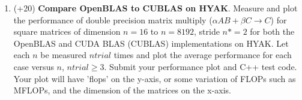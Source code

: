 \documentclass[10pt]{article}
\theoremstyle{definition}
\theoremstyle{remark}
\newtheorem*{solution}{Solution}
\begin{document}
\begin{enumerate}
\begin{enumerate}[label=\alph*]
        \item Find the temperature in the rod given initial conditions $\kappa = 10^3 \frac{m^2}{s}$ and 
        \begin{align*}
        T(x,0) = \begin{cases}
        0 & |x| > 1 m \\
        100^{o} C & |x| \le 1 m 
        \end{cases}
        \end{align*}
        \begin{solution}
            We are given $T_0(x) = T(x,0)$ as defined above. We begin by Fourier transforming this initial condition to find $\hat T_0(k)$.
            \begin{align*}
                \hat T_0(k) &= \frac{1}{\sqrt{2\pi}} \int_{-\infty}^\infty T_0(x) e^{ikx} dx \\
                &= \frac{100}{\sqrt{2\pi}} \int_{-1}^1 e^{ikx} dx = \frac{100}{\sqrt{2\pi}} \frac{e^{ikx}}{ik} \Bigg|_{-1}^1 \\&= 100\sqrt{\frac{2}{\pi}} \frac{\sin(k)}{k}
            \end{align*}

            Having found $\hat T_0(k)$, we can plug this in to our inverse Fourier transform expression derived in part (a) to recover our solution $T(x,t)$.

            \begin{align*}
                T(x,t) &= \frac{100}{\pi} \int_{-\infty}^\infty \frac{\sin(k)}{k} e^{-\kappa k^2 t - ikx} dk 
            \end{align*}
        \end{solution}
    \end{enumerate} 

    \item (+20) \textbf{Compare OpenBLAS to CUBLAS on HYAK}. Measure and plot the performance of double precision matrix multiply ($\alpha A B + \beta C \rightarrow C$) for square matrices of dimension $n=16$ to $n=8192$, stride $n*=2$ for both the OpenBLAS and CUDA BLAS (CUBLAS) implementations on HYAK. Let each $n$ be measured $ntrial$ times and plot the average performance for each case versus $n$, $ntrial\geq 3$. Submit your performance plot and C++ test code. Your plot will have 'flops' on the y-axis, or some variation of FLOPs such as MFLOPs, and the dimension of the matrices on the x-axis.  
    

\end{enumerate}
\end{document}
